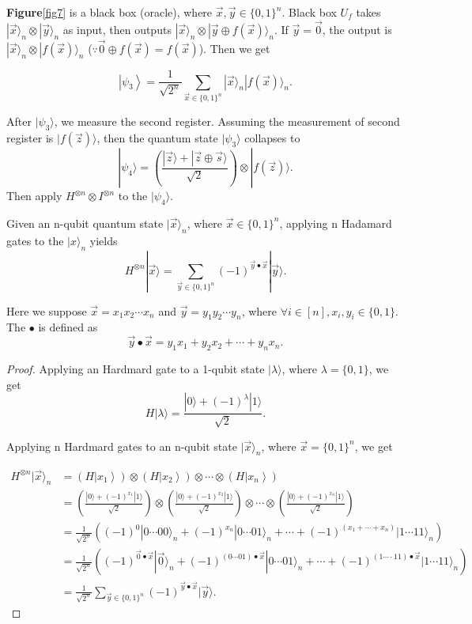 \textbf{Figure}\ref{fig7} is a black box (oracle), where $\vec{x}, \vec{y}\in \{0,1\}^n$. Black box $U_f$ takes $|\vec{x}\rangle_n \otimes |\vec{y}\rangle_n$ as input, then outputs $|\vec{x}\rangle_n \otimes|\vec{y}\oplus f(\vec{x})\rangle_n$. If $\vec{y} = \vec{0}$, the output is $|\vec{x}\rangle_n \otimes |f(\vec{x})\rangle_n$ ($\because \vec{0} \oplus f(\vec{x}) = f(\vec{x})$). Then we get

$$
\left|\psi_3\right\rangle=\frac{1}{\sqrt{2^n}} \sum_{\vec{x} \in\{0,1\}^n}|\vec{x}\rangle_n|f(\vec{x})\rangle_n.
$$

After $|\psi_3\rangle$, we measure the second register. Assuming the measurement of second register is $|f(\vec{z})\rangle$, then the quantum state $|\psi_3\rangle$ collapses to
$$
|\psi_4\rangle = \left(\frac{|\vec{z}\rangle+|\vec{z} \oplus \vec{s}\rangle}{\sqrt{2}}\right) \otimes|f(\vec{z})\rangle.
$$
Then apply $H^{\otimes n} \otimes I^{\otimes n}$ to the $|\psi_4\rangle$. 

\begin{remark}[再揭]
 Given an n-qubit quantum state $|\vec{x}\rangle_n$, where $\vec{x} \in \{0,1\}^n$, applying n Hadamard gates to the $|x\rangle_n$ yields 
 $$
 H^{\otimes n}|\vec{x}\rangle=\sum_{\vec{y} \in\{0,1\}^n}(-1)^{\vec{y} \bullet \vec{x}}|\vec{y}\rangle.
 $$
 
 Here we suppose $\vec{x} = x_1 x_2 \cdots x_n$ and $\vec{y} = y_1 y_2 \cdots y_n$, where $\forall i \in [n],x_i,y_i \in \{0,1\}$. The $\bullet$ is defined as 
 $$
 \vec{y} \bullet \vec{x} = y_1 x_1 + y_2 x_2 + \cdots + y_n x_n.
 $$
\end{remark}

\begin{proof}
Applying an Hardmard gate to a 1-qubit state $|\lambda\rangle$, where $\lambda = \{0,1\}$, we get 
$$
H|\lambda\rangle = \frac{|0\rangle + (-1)^{\lambda}|1\rangle}{\sqrt{2}}.
$$

Applying n Hardmard gates to an n-qubit state $|\vec{x}\rangle_n$, where $\vec{x} = \{0,1\}^n$, we get 

$$
\begin{aligned}
H ^{\otimes n}|\vec{x}\rangle_n
& = \left(H\left|x_1\right\rangle\right) \otimes\left(H\left|x_2\right\rangle\right) \otimes \cdots \otimes\left(H\left|x_n\right\rangle\right) \\
& = \left(\frac{|0\rangle+(-1)^{x_1}|1\rangle}{\sqrt{2}}\right) \otimes\left(\frac{|0\rangle+(-1)^{x_2}|1\rangle}{\sqrt{2}}\right) \otimes \cdots \otimes\left(\frac{|0\rangle+(-1)^{x_n}|1\rangle}{\sqrt{2}}\right) \\
& = \frac{1}{\sqrt{2^n}}\left((-1)^{0}|0 \cdots 00\rangle_n+(-1)^{x_n}|0 \cdots 01\rangle_n+\cdots+(-1)^{\left(x_1+\cdots+x_n\right)}|1 \cdots 11\rangle_n\right) \\
& = \frac{1}{\sqrt{2^n}}\left((-1)^{\vec{0} \bullet \vec{x}}|\vec{0}\rangle_n+(-1)^{(0 \cdots 01) \bullet \vec{x}}|0 \cdots 01\rangle_n+\cdots+(-1)^{(1\cdots \cdot 11) \bullet \vec{x}}|1\cdots 11\rangle_n\right) \\
& = \frac{1}{\sqrt{2^n}}\sum_{\vec{y} \in\{0,1\}^n}(-1)^{\vec{y} \bullet \vec{x}}|\vec{y}\rangle.
\end{aligned}
$$
\end{proof}


